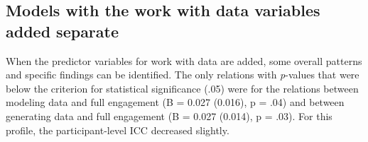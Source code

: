 \documentclass[]{book}
\theoremstyle{definition}
\theoremstyle{definition}
\theoremstyle{definition}
\theoremstyle{remark}
\begin{document}
\begin{landscape}\begin{table}

\caption{\label{tab:rq2-1-corr-ind-aspects}Correlations between individual aspects of work with data nad the composite and the variables that make up the profiles}
\centering
{}
\end{table}
\end{landscape}

\subsection{Models with the work with data variables added
separate}\label{models-with-the-work-with-data-variables-added-separate}

When the predictor variables for work with data are added, some overall
patterns and specific findings can be identified. The only relations
with \emph{p}-values that were below the criterion for statistical
significance (.05) were for the relations between modeling data and full
engagement (B = 0.027 (0.016), p = .04) and between generating data and
full engagement (B = 0.027 (0.014), p = .03). For this profile, the
participant-level ICC decreased slightly.
\end{document}
